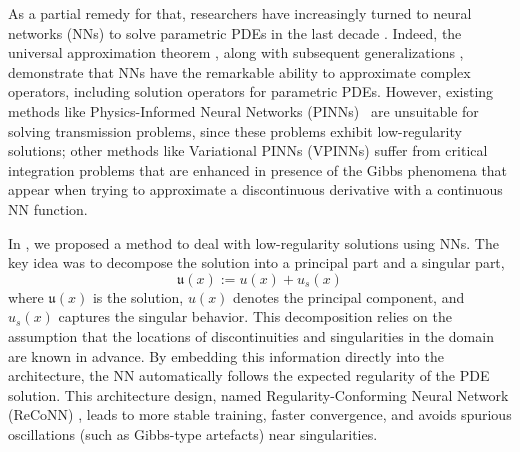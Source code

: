 \documentclass[oneside]{article}
\begin{document}

As a partial remedy for that, researchers have increasingly turned to neural networks (NNs) to solve parametric PDEs in the last decade \cite{bhattacharya2021model, brevis2024learning, dal2020data, geist2021numerical, han2018solving, khara2024neufenet, khoo2021solving, kutyniok2022theoretical, uriarte2022finite}. Indeed, the universal approximation theorem \cite{pinkus1999approximation}, along with subsequent generalizations \cite{chen1995approximation, chen1995universal}, demonstrate that NNs have the remarkable ability to approximate complex operators, including solution operators for parametric PDEs. However, existing methods like Physics-Informed Neural Networks (PINNs)~\cite{raissi2019physics} are unsuitable for solving transmission problems, since these problems exhibit low-regularity solutions; other methods like Variational PINNs (VPINNs) \cite{kharazmi2019variational} suffer from critical integration problems \cite{taylor2025stochastic} that are enhanced in presence of the Gibbs phenomena that appear when trying to approximate a discontinuous derivative with a continuous NN function.


In \cite{taylor2024regularity}, we proposed a method to deal with low-regularity solutions using NNs. The key idea was to decompose the solution into a principal part and a singular part,
\begin{equation}
     \mathfrak{u}(x):= u(x) + u_s(x)
\end{equation}
where $\mathfrak{u}(x)$ is the solution, $u(x)$ denotes the principal component, and $u_s(x)$ captures the singular behavior. This decomposition relies on the assumption that the locations of discontinuities and singularities in the domain are known in advance. By embedding this information directly into the architecture, the NN automatically follows the expected regularity of the PDE solution. This architecture design, named Regularity-Conforming Neural Network (ReCoNN) \cite{taylor2024regularity}, leads to more stable training, faster convergence, and avoids spurious oscillations (such as Gibbs-type artefacts) near singularities.

\end{document}

